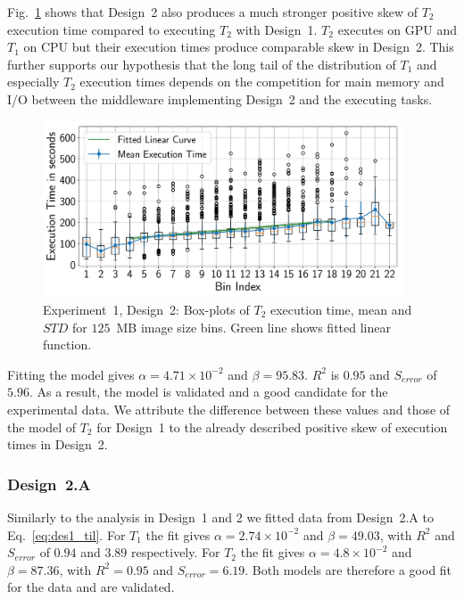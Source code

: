 Fig.~\ref{fig:stage_2_execution_des2} shows that Design~2 also produces a much stronger positive skew of $T_{2}$ execution time compared to executing $T_{2}$ with Design~1.
$T_{2}$ executes on GPU and $T_{1}$ on CPU but their execution times produce comparable skew in Design~2.
This further supports our hypothesis that the long tail of the distribution of $T_{1}$ and especially $T_{2}$ execution times depends on the competition for main memory and I/O between the middleware implementing Design~2 and the executing tasks.


\begin{figure}[ht!]
    \centering
    \includegraphics[width=0.95\textwidth]{figures/designs/stage_1_tx_box_des2.pdf}
    \caption{Experiment~1, Design~2: Box-plots of $T_{2}$ execution time, mean and $STD$ for $125$~MB image size bins.
        Green line shows fitted linear function.}\label{fig:stage_2_execution_des2}
\end{figure}


Fitting the model gives $\alpha = 4.71 \times 10^{-2}$ and $\beta = 95.83$.
$R^{2}$ is $0.95$ and $S_{error}$ of $5.96$.
As a result, the model is validated and a good candidate for the experimental data.
We attribute the difference between these values and those of the model of $T_{2}$ for Design~1 to the already described positive skew of execution times in Design~2.

\subsubsection{Design~2.A} Similarly to the analysis in Design~1 and 2 we fitted data from Design~2.A to Eq.~\ref{eq:des1_til}.
For $T_{1}$ the fit gives $\alpha=2.74\times10^{-2}$ and $\beta=49.03$, with $R^{2}$ and $S_{error}$ of $0.94$ and $3.89$ respectively.
For $T_{2}$ the fit gives $\alpha=4.8\times10^{-2}$ and $\beta=87.36$, with $R^{2}=0.95$ and $S_{error}=6.19$.
Both models are therefore a good fit for the data and are validated.


